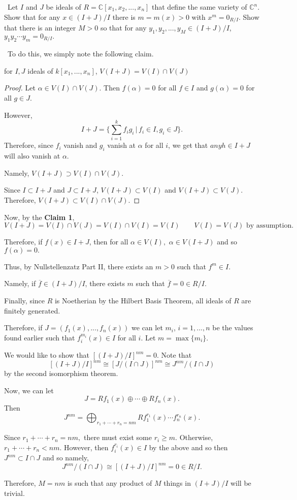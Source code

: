 \documentclass[12pt]{Qual}
\begin{document}
\begin{problem} $\,$
Let $I$ and $J$ be ideals of $R=\mathbb{C}[x_1,x_2,...,x_n]$ that define the same variety of $\mathbb{C}^n$. Show that for any $x\in (I+J)/I$ there is $m=m(x)>0$ with $x^m=0_{R/I}$. Show that there is an integer $M>0$ so that for any $y_1,y_2,...,y_M\in (I+J)/I$, $y_1y_2\cdots y_m=0_{R/I}.$
\end{problem}


\begin{solution}$\,$
To do this, we simply note the following claim.

\begin{claim} for $I,J$ ideals of $k[x_1,...,x_n]$, $V(I+J)=V(I)\cap V(J)$
\begin{proof} \boxed{\supset} Let $\alpha\in V(I)\cap V(J)$. Then $f(\alpha)=0$ for all $f\in I$ and $g(\alpha)=0$ for all $g\in J$.

However, $$I+J=\{\sum_{i=1}^kf_ig_i\,|\,f_i\in I,g_i\in J\}.$$ Therefore, since $f_i$ vanish and $g_i$ vanish at $\alpha$ for all $i$, we get that $any h\in I+J$ will also vanish at $\alpha.$

Namely, $V(I+J)\supset V(I)\cap V(J).$

\boxed{\subset} Since $I\subset I+J$ and $J\subset I+J$, $V(I+J)\subset V(I)$ and $V(I+J)\subset V(J)$. Therefore, $V(I+J)\subset V(I)\cap V(J).$
\end{proof}
\end{claim}

Now, by the \textbf{Claim 1}, $$V(I+J)=V(I)\cap V(J)=V(I)\cap V(I)=V(I)\qquad V(I)=V(J)\text{ by assumption.}$$

Therefore, if $f(x)\in I+J$, then for all $\alpha\in V(I),$ $\alpha\in V(I+J)$ and so $f(\alpha)=0.$

Thus, by Nullstellenzatz Part II, there exists an $m>0$ such that $f^m\in I$.

Namely, if $\overline{f}\in (I+J)/I$, there exists $m$ such that $\overline{f}=0\in R/I$.

Finally, since $R$ is Noetherian by the Hilbert Basis Theorem, all ideals of $R$ are finitely generated.

Therefore, if $J=(f_1(x),...,f_n(x))$ we can let $m_i$, $i=1,...,n$ be the values found earlier such that $f_i^{m_i}(x)\in I$ for all $i$. Let $m=\max\{m_i\}$.

We would like to show that $[(I+J)/I]^{nm}=0$. Note that $$[(I+J)/I]^{nm}\cong[J/(I\cap J)]^{nm}\cong J^{nm}/(I\cap J)$$ by the second isomorphism theorem.

Now, we can let $$J=Rf_1(x)\oplus\cdots\oplus Rf_n(x).$$ Then $$J^{nm}=\bigoplus_{r_1+\cdots+r_n=nm}Rf_1^{r_1}(x)\cdots f_n^{r_n}(x).$$

Since $r_1+\cdots+r_n=nm,$ there must exist some $r_i\ge m$. Otherwise, $r_1+\cdots+r_n<nm.$ However, then $f_i^{r_i}(x)\in I$ by the above and so then $J^{nm}\subset I\cap J$ and so namely, $$J^{nm}/(I\cap J)\cong [(I+J)/I]^{nm}=0\in R/I.$$

Therefore, $M=nm$ is such that any product of $M$ things in $(I+J)/I$ will be trivial.
\end{solution}
\newpage
\end{document}
